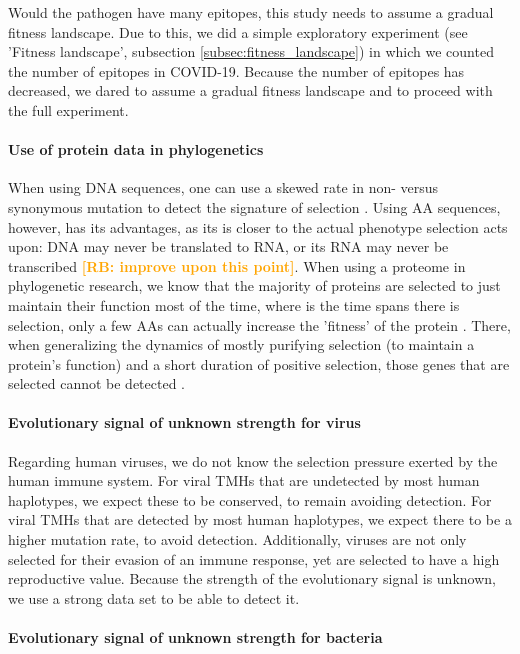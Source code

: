 \documentclass{article}
\newcommand{\richel}[1]{\textcolor{orange}{\textbf{[RB: #1]}}}
\begin{document}
Would the pathogen have many epitopes, this study needs to 
assume a gradual fitness landscape. Due to this, we did a simple 
exploratory experiment (see 'Fitness landscape', 
subsection \ref{subsec:fitness_landscape}) in which
we counted the number of epitopes in COVID-19. Because the number
of epitopes has decreased, we dared to assume a gradual fitness landscape
and to proceed with the full experiment.

\paragraph{Use of protein data in phylogenetics}

When using DNA sequences, one can use a skewed rate 
in non- versus synonymous mutation
to detect the signature of selection \cite{murrell2015gene}.
Using AA sequences, however, has its advantages,
as its is closer to the actual phenotype
selection acts upon: DNA may never be translated to RNA,
or its RNA may never be transcribed \cite{diz2012proteomics}
\richel{improve upon this point}.
When using a proteome in phylogenetic research,
we know that the majority of proteins are selected to just 
maintain their function most of the time, where
is the time spans there is selection, only a few AAs
can actually increase the 'fitness' of the 
protein \cite{anisimova2009investigating}.
There, when generalizing the dynamics of mostly purifying selection (to maintain
a protein's function) and a short duration of positive selection,
those genes that are selected cannot be detected \cite{yang2000statistical}.

\paragraph{Evolutionary signal of unknown strength for virus}

Regarding human viruses, we do not know the selection pressure
exerted by the human immune system.
For viral TMHs that are undetected by most human haplotypes, we
expect these to be conserved, to remain avoiding detection.
For viral TMHs that are detected by most human haplotypes, we
expect there to be a higher mutation rate, to avoid detection.
Additionally, viruses are not only selected for their evasion of an 
immune response, yet are selected to have a high reproductive value.
Because the strength of the evolutionary signal is unknown,
we use a strong data set to be able to detect it.

\paragraph{Evolutionary signal of unknown strength for bacteria}
\end{document}
